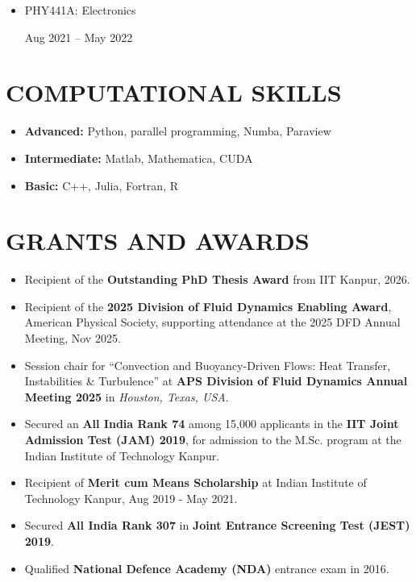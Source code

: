 \documentclass[10pt,a4paper]{article}
\begin{document}
\begin{itemize}[leftmargin=1.5em, itemsep=3.5pt, parsep=0pt]
  \item \begin{minipage}[t]{0.80\linewidth}
          PHY441A: Electronics
        \end{minipage}%
        \begin{minipage}[t]{0.20\linewidth}
          \raggedleft
          Aug 2021 -- May 2022
        \end{minipage}
\end{itemize}

\section{COMPUTATIONAL SKILLS}
\begin{itemize}[leftmargin=1.5em, itemsep=1.5pt, parsep=0pt]
  \item \textbf{Advanced:} Python, parallel programming, Numba, Paraview
  \item \textbf{Intermediate:} Matlab, Mathematica, CUDA
  \item \textbf{Basic:} C++, Julia, Fortran, R
\end{itemize}

\section{GRANTS AND AWARDS}
\begin{itemize}[leftmargin=1.5em, itemsep=1pt, parsep=0pt]
  \item Recipient of the \textbf{Outstanding PhD Thesis Award} from IIT Kanpur, 2026.
  \item Recipient of the \textbf{2025 Division of Fluid Dynamics Enabling Award}, American Physical Society, supporting attendance at the 2025 DFD Annual Meeting, Nov 2025.
  \item Session chair for ``Convection and Buoyancy-Driven Flows: Heat Transfer, Instabilities \& Turbulence'' at \textbf{APS Division of Fluid Dynamics Annual Meeting 2025} in \textit{Houston, Texas, USA}.
  \item Secured an \textbf{All India Rank 74} among 15,000 applicants in the \textbf{IIT Joint Admission Test (JAM) 2019}, for admission to the M.Sc. program at the Indian Institute of Technology Kanpur.
  \item Recipient of \textbf{Merit cum Means Scholarship} at Indian Institute of Technology Kanpur, Aug 2019 - May 2021.
  \item Secured \textbf{All India Rank 307} in \textbf{Joint Entrance Screening Test (JEST) 2019}.
  \item Qualified \textbf{National Defence Academy (NDA)} entrance exam in 2016.
\end{itemize}
\end{document}
